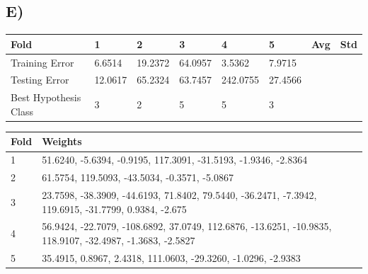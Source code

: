 \documentclass{report}
\begin{document}
\subsection*{E)}
\begin{center}
    \begin{tabular}{| l | l | l | l | l | l | l | l |}
    \hline
    Fold & 1 & 2 & 3 & 4 & 5 & Avg & Std \\ \hline
    Training Error & 6.6514 & 19.2372 & 64.0957 & 3.5362 & 7.9715 & &  \\ \hline
    Testing Error & 12.0617 & 65.2324 & 63.7457 & 242.0755 & 27.4566 & &  \\ \hline
    Best Hypothesis Class & 3 & 2 & 5 & 5 & 3 & & \\ \hline
    \end{tabular}
\end{center}
\begin{center}
    \begin{tabular}{| l | l |}
    \hline
    Fold & Weights \\ \hline
    1 & 51.6240,   -5.6394,   -0.9195,  117.3091,
         -31.5193,   -1.9346,   -2.8364 \\ \hline
    2 & 61.5754,  119.5093,  -43.5034,   -0.3571,
          -5.0867 \\ \hline
    3 & 23.7598,  -38.3909,  -44.6193,   71.8402,
          79.5440,  -36.2471,   -7.3942,  119.6915,
         -31.7799,    0.9384,   -2.675 \\ \hline
    4 & 56.9424,  -22.7079, -108.6892,   37.0749,
         112.6876,  -13.6251,  -10.9835,  118.9107,
         -32.4987,   -1.3683,   -2.5827 \\ \hline
    5 & 35.4915,    0.8967,    2.4318,  111.0603,
         -29.3260,   -1.0296,   -2.9383 \\ \hline
    \end{tabular}
\end{center}
\end{document}
